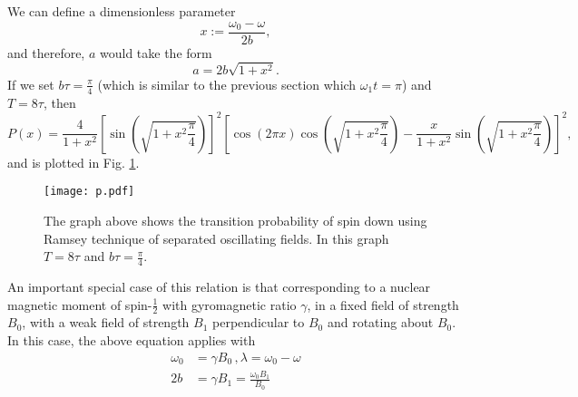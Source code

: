 %
We can define a dimensionless parameter
%
\begin{equation}
x:= \frac{\omega_0 - \omega}{2b} , 
\end{equation}
and therefore, $a$ would take the form 
\begin{equation}
a= 2b \sqrt{1+x^2} .
\end{equation}
If we set $b\tau = \frac{\pi}{4}$ (which is similar to the previous
section which $\omega_1 t= \pi$) and $T=8\tau$, then
%
\begin{equation}
P(x)= \frac{4}{1+x^2} \left[ \sin ( \sqrt{1+x^2 \frac{\pi}{4}}) \right]^2
\left[
\cos (2 \pi x) \cos (\sqrt{1+x^2 \frac{\pi}{4}}) - \frac{x}{1+x^2} \sin ( \sqrt{1+x^2 \frac{\pi}{4}}) \right] ^2 ,
\end{equation}
%
and is plotted in Fig. \ref{fig:transprob}.
% 
\begin{figure}[h]
  \centering
    \texttt{[image: p.pdf]}
    \caption{ The graph above shows the transition probability of spin
      down using Ramsey technique of separated oscillating fields. In
      this graph $T=8\tau$ and $ b \tau = \frac{\pi}{4}$. }
    \label{fig:transprob}
\end{figure}
%
An important special case of this relation is that corresponding to a
nuclear magnetic moment of spin-$\frac{1}{2}$ with gyromagnetic ratio
$\gamma$, in a fixed field of strength $B_0$, with a weak field of
strength $B_1$ perpendicular to $B_0$ and rotating about $B_0$. In
this case, the above equation applies with
\begin{align}
\omega_0 &= \gamma B_0 \, , \lambda=\omega_0 - \omega \\
2b &= \gamma B_1 =\frac{\omega_0 B_1}{B_0}
\end{align}
